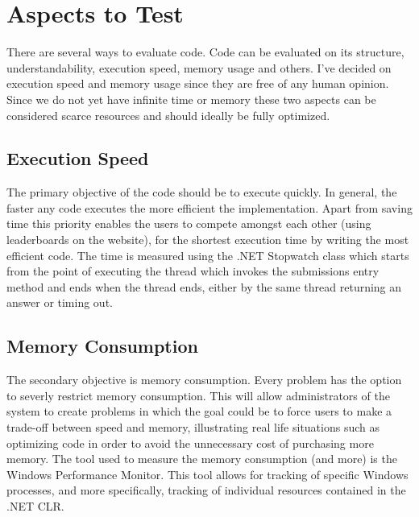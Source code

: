 \section{Aspects to Test}
There are several ways to evaluate code. Code can be evaluated on its structure, understandability, execution speed, memory usage and others. I've decided on execution speed and memory usage since they are free of any human opinion. Since we do not yet have infinite time or memory these two aspects can be considered scarce resources and should ideally be fully optimized.


\subsection{Execution Speed}
The primary objective of the code should be to execute quickly. In general, the faster any code executes the more efficient the implementation. Apart from saving time this priority enables the users to compete amongst each other (using leaderboards on the website), for the shortest execution time by writing the most efficient code. 
The time is measured using the .NET Stopwatch class \cite{Stopwatch} which starts from the point of executing the thread which invokes the submissions entry method and ends when the thread ends, either by the same thread returning an answer or timing out. 


\subsection{Memory Consumption}
The secondary objective is memory consumption. Every problem has the option to severly restrict memory consumption. This will allow administrators of the system to create problems in which the goal could be to force users to make a trade-off between speed and memory, illustrating real life situations such as optimizing code in order to avoid the unnecessary cost of purchasing more memory.
The tool used to measure the memory consumption (and more) is the Windows Performance Monitor. This tool allows for tracking of specific Windows processes, and more specifically, tracking of individual resources contained in the .NET CLR.
